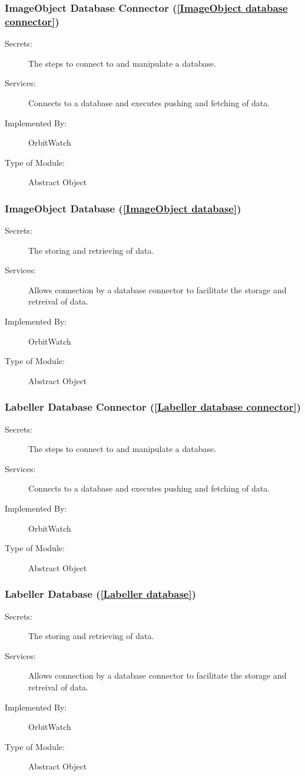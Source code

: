 \documentclass[12pt, titlepage]{article}
\begin{document}
\subsubsection{ImageObject Database Connector (\ref{ImageObject database connector})}
\begin{description}
\item[Secrets:] The steps to connect to and manipulate a database.
\item[Services:] Connects to a database and executes pushing and fetching of data.
\item[Implemented By:] OrbitWatch
\item[Type of Module:] Abstract Object
\end{description}

\subsubsection{ImageObject Database (\ref{ImageObject database})}
\begin{description}
\item[Secrets:] The storing and retrieving of data.
\item[Services:] Allows connection by a database connector to facilitate the storage and retreival of data.
\item[Implemented By:] OrbitWatch
\item[Type of Module:] Abstract Object
\end{description}

\subsubsection{Labeller Database Connector (\ref{Labeller database connector})}
\begin{description}
\item[Secrets:] The steps to connect to and manipulate a database.
\item[Services:] Connects to a database and executes pushing and fetching of data.
\item[Implemented By:] OrbitWatch
\item[Type of Module:] Abstract Object
\end{description}

\subsubsection{Labeller Database (\ref{Labeller database})}
\begin{description}
\item[Secrets:] The storing and retrieving of data.
\item[Services:] Allows connection by a database connector to facilitate the storage and retreival of data.
\item[Implemented By:] OrbitWatch
\item[Type of Module:] Abstract Object
\end{description}
\end{document}
